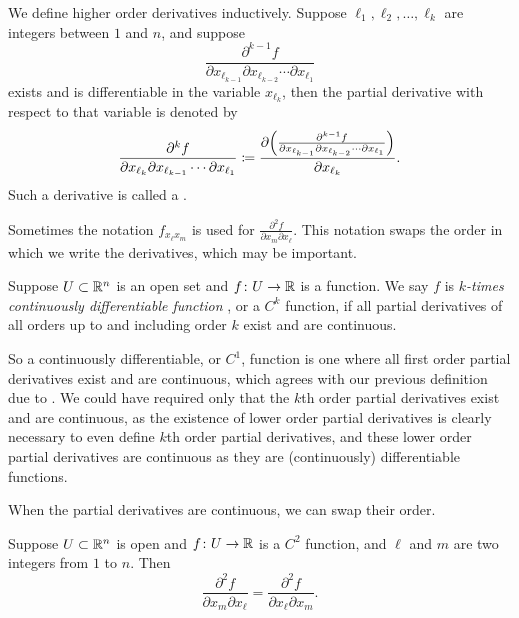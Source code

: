 We define higher order derivatives inductively.
Suppose ${\ell}_1,{\ell}_2,\ldots,{\ell}_k$ are integers between $1$ and $n$, and
suppose 
\begin{equation*}
\frac{\partial^{k-1} f}{\partial x_{{\ell}_{k-1}} \partial x_{{\ell}_{k-2}}
\cdots \partial x_{{\ell}_1}}
\end{equation*}
exists and is differentiable in the variable $x_{{\ell}_{k}}$, then the
partial derivative with respect to that variable is denoted by
\begin{equation*}
\frac{\partial^{k} f}{\partial x_{{\ell}_{k}} \partial x_{{\ell}_{k-1}}
\cdots \partial x_{{\ell}_1}}
\coloneqq 
\frac{\partial \Bigl( \frac{\partial^{k-1} f}{\partial x_{{\ell}_{k-1}} \partial
x_{{\ell}_{k-2}} \cdots \partial x_{{\ell}_1}} \Bigr)}{\partial x_{{\ell}_{k}}} .
\end{equation*}
Such a derivative is called a
\emph{}.

Sometimes the notation $f_{x_{\ell} x_m}$ is used for
$\frac{\partial^2 f}{\partial x_m \partial x_{\ell}}$.  This notation
swaps the order in which we write the derivatives, which may be important.

\begin{defn}
Suppose $U \subset {\mathbb{R}}^n$ is an open set and
$f \colon U \to {\mathbb{R}}$ is a function.  We say $f$ is
\emph{$k$-times continuously differentiable function}%
,
or a $C^k$ function, if all partial derivatives of all orders up to and
including order $k$ exist and are continuous.
\end{defn}

So a continuously differentiable, or $C^1$, function is one where all
first order partial
derivatives exist and are continuous, which agrees with our previous
definition due to .  We
could have required only that the $k$th order partial derivatives exist and
are continuous, as the existence of lower order partial derivatives is clearly
necessary to even define $k$th order partial derivatives,
and these lower order partial derivatives are continuous as they are
(continuously) differentiable functions.

When the partial derivatives are continuous, we can swap their order.

\begin{prop} \label{mv:prop:swapders}
Suppose $U \subset {\mathbb{R}}^n$ is open and $f \colon U \to {\mathbb{R}}$ is a $C^2$
function, and $\ell$ and $m$ are two integers from $1$ to $n$.  Then
\begin{equation*}
\frac{\partial^2 f}{\partial x_m \partial x_{\ell}}
=
\frac{\partial^2 f}{\partial x_{\ell} \partial x_m} .
\end{equation*}
\end{prop}

